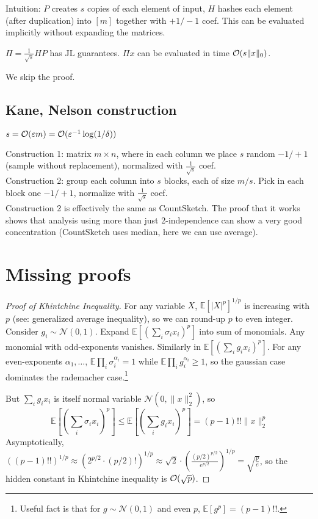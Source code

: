 \documentclass[11pt]{article}
\newcommand{\E}{{\mathbb E}}
\newcommand{\eps}{\varepsilon}
\begin{document}
Intuition:
$P$ creates $s$ copies of each element of input, $H$ hashes each element (after duplication) into $[m]$ together with $+1/-1$ coef. This can be evaluated implicitly without expanding the matrices.


\begin{theorem}
$\Pi = \frac{1}{\sqrt{s}}HP$ has JL guarantees. $\Pi x$ can be evaluated in time $\mathcal{O}(s \|x\|_0)$.
\end{theorem}
We skip the proof.

\subsection{Kane, Nelson construction}
$s = \bigo(\eps m) = \bigo(\varepsilon^{-1} \log(1/\delta))$

Construction 1: matrix $m \times n$, where in each column we place $s$ random $-1/+1$ (sample without replacement), normalized with $\frac{1}{\sqrt{s}}$ coef.\\
Construction 2: group each column into $s$ blocks, each of size $m/s$. Pick in each block one $-1/+1$, normalize with $\frac{1}{\sqrt{s}}$ coef.\\

Construction 2 is effectively the same as \textsf{CountSketch}. The proof that it works shows that analysis using more than just 2-independence can show a very good concentration (CountSketch uses median, here we can use average).


\section{Missing proofs}
\begin{proof}[Proof of Khintchine Inequality]
For any variable $X$, $\E[|X|^p]^{1/p}$ is increasing with $p$ (see: generalized average inequality), so we can round-up $p$ to even integer. Consider $g_i \sim \mathcal{N}(0,1)$.
Expand $\E[ (\sum_i \sigma_i x_i)^p]$ into sum of monomials. Any monomial with odd-exponents vanishes. Similarly in $\E[ (\sum_i g_i x_i)^p ]$. For any even-exponents $\alpha_1,\ldots$, $\E \prod_i \sigma_i^{\alpha_i} = 1$ while $\E \prod_i g_i^{\alpha_i} \ge 1$, so the gaussian case dominates the rademacher case.\footnote{Useful fact is that for $g \sim \mathcal{N}(0,1)$ and even $p$, $\E[g^p] = (p-1)!!$.}

But $\sum_i g_i x_i$ is itself normal variable $\mathcal{N}(0,\|x\|_2^2)$, so
$$\E[ (\sum_i \sigma_i x_i)^p ] \le \E[ (\sum_i g_i x_i)^p ] =  (p-1)!! \|x\|_2^p$$
Asymptotically, $((p-1)!!)^{1/p} \approx (2^{p/2} \cdot (p/2)!)^{1/p} \approx \sqrt{2} \cdot \left(\frac{(p/2)^{p/2}}{e^{p/2}} \right)^{1/p} = \sqrt{\frac{p}{e}}$, so the hidden constant in Khintchine inequality is $\mathcal{O}(\sqrt{p})$.

\end{proof}



\end{document}
